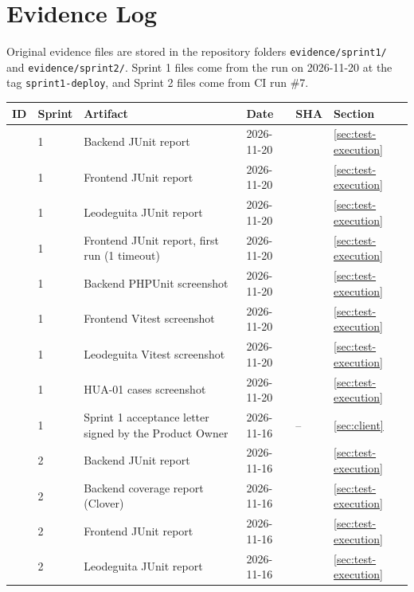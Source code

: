 \section{Evidence Log}
\label{app:evidence}

Original evidence files are stored in the repository folders \nolinkurl{evidence/sprint1/} and \nolinkurl{evidence/sprint2/}.
Sprint 1 files come from the run on 2026-11-20 at the tag \texttt{sprint1-deploy}, and Sprint 2 files come from CI run \#7.

\begin{longtable}{@{}L{1.9cm}L{1.2cm}L{5cm}L{2.2cm}L{2cm}L{1.4cm}@{}}
  \toprule
  ID & Sprint & Artifact & Date & SHA & Section \\
  \midrule
  \endhead
   & 1 & Backend JUnit report & 2026-11-20 &  &\ref{sec:test-execution} \\
   & 1 & Frontend JUnit report & 2026-11-20 &  &\ref{sec:test-execution} \\
   & 1 & Leodeguita JUnit report & 2026-11-20 &  &\ref{sec:test-execution} \\
   & 1 & Frontend JUnit report, first run (1 timeout) & 2026-11-20 &  &\ref{sec:test-execution} \\
   & 1 & Backend PHPUnit screenshot & 2026-11-20 &  &\ref{sec:test-execution} \\
   & 1 & Frontend Vitest screenshot & 2026-11-20 &  &\ref{sec:test-execution} \\
   & 1 & Leodeguita Vitest screenshot & 2026-11-20 &  &\ref{sec:test-execution} \\
   & 1 & HUA-01 cases screenshot & 2026-11-20 &  &\ref{sec:test-execution} \\
   & 1 & Sprint 1 acceptance letter signed by the Product Owner & 2026-11-16 & -- &\ref{sec:client} \\
   & 2 & Backend JUnit report & 2026-11-16 &  &\ref{sec:test-execution} \\
   & 2 & Backend coverage report (Clover) & 2026-11-16 &  &\ref{sec:test-execution} \\
   & 2 & Frontend JUnit report & 2026-11-16 &  &\ref{sec:test-execution} \\
   & 2 & Leodeguita JUnit report & 2026-11-16 &  &\ref{sec:test-execution} \\

\end{longtable}
